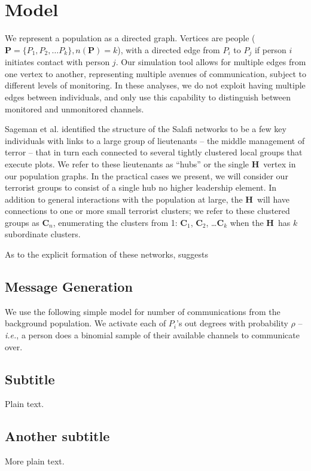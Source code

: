 \documentclass{article}
\newcommand{\Hub}[0]{\ensuremath{\mathbf{H}}}
\newcommand{\C}[1]{\ensuremath{\mathbf{C}_{#1}}}
\begin{document}
\section*{Model}
We represent a population as a directed graph.  Vertices are people ($\mathbf{P}=\{P_1, P_2, \ldots P_k\}, n(\mathbf{P})=k$), with a directed edge from $P_i$ to $P_j$ if person $i$ initiates contact with person $j$.  Our simulation tool allows for multiple edges from one vertex to another, representing multiple avenues of communication, subject to different levels of monitoring.  In these analyses, we do not exploit having multiple edges between individuals, and only use this capability to distinguish between monitored and unmonitored channels.  

Sageman et al. identified the structure of the Salafi networks to be a few key individuals with links to a large group of lieutenants -- the middle management of terror -- that in turn each connected to several tightly clustered local groups that execute plots.  We refer to these lieutenants as ``hubs'' or the single \Hub\ vertex in our population graphs.  In the practical cases we present, we will consider our terrorist groups to consist of a single hub no higher leadership element.  In addition to general interactions with the population at large, the \Hub\ will have connections to one or more small terrorist clusters; we refer to these clustered groups as \C{n}, enumerating the clusters from 1: \C{1}, \C{2}, \ldots \C{k} when the \Hub\ has $k$ subordinate clusters.

As to the explicit formation of these networks, \cite{sageman} suggests



\subsection*{Message Generation}

We use the following simple model for number of communications from the background population.  We activate each of $P_i$'s out degrees with probability $\rho$ -- {\em i.e.}, a person does a binomial sample of their available channels to communicate over.

\subsection{Subtitle}

Plain text.

\subsection{Another subtitle}

More plain text.

\newpage


\end{document}

